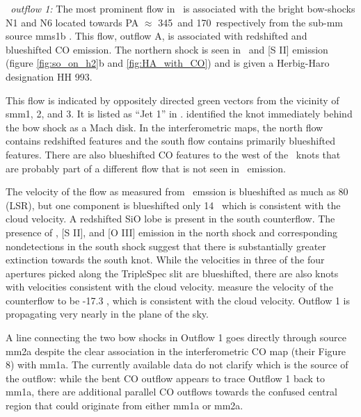  {\it \region\ outflow 1:} The most prominent flow in \htwo\ is associated with
 the bright bow-shocks N1 and N6 \citep{khanzadyan2004} located towards PA $\approx$ 345\arcdeg\
 and 170\arcdeg\ respectively from the sub-mm source mms1b \citep{beuther2002}.
 This flow, \citet{beuther2002} outflow A, is associated with redshifted and
 blueshifted CO emission.  The northern shock is seen in \ha\ and [S II]
 emission (figure \ref{fig:so_on_h2}b and \ref{fig:HA_with_CO}) and is given a Herbig-Haro designation
 HH 993.

 This flow is indicated by oppositely directed green vectors from the vicinity
 of smm1, 2, and 3.   It is listed as ``Jet 1'' in \citet{qiu2008}.  \citet{kumar2002}
 identified the knot immediately behind the bow shock as a Mach disk.  In the
 \citet{beuther2002} interferometric maps, the north flow contains redshifted features
 and the south flow contains primarily blueshifted features.  There are also blueshifted 
 CO features to the west of the \hh\ knots that are probably part of a different flow
 that is not seen in \hh\ emission.
 
 The velocity of the flow as measured from \hh\ emssion is blueshifted as much
 as 80 \kms (LSR), but one component is blueshifted only 14 \kms\, which is
 consistent with the cloud velocity.  A redshifted SiO lobe is present in the
 south counterflow.  The presence of \ha, [S II], and [O III] emission in the
 north shock and corresponding nondetections in the south shock suggest that
 there is substantially greater extinction towards the south knot.  While the
 velocities in three of the four apertures picked along the TripleSpec slit are
 blueshifted, there are also knots with velocities consistent with the cloud
 velocity.  \citet{porras2000} measure the velocity of the counterflow to be
 -17.3 \kms, which is consistent with the cloud velocity. Outflow 1 is
 propagating very nearly in the plane of the sky.


A line connecting the two bow shocks in Outflow 1 goes directly through
\citet{beuther2007} source mm2a despite the clear association in the
\citet{beuther2002} interferometric CO map (their Figure 8) with mm1a.  The
currently available data do not clarify which is the source of the outflow:
while the bent CO outflow appears to trace Outflow 1 back to mm1a, there are
additional parallel CO outflows towards the confused central region that could
originate from either mm1a or mm2a.

